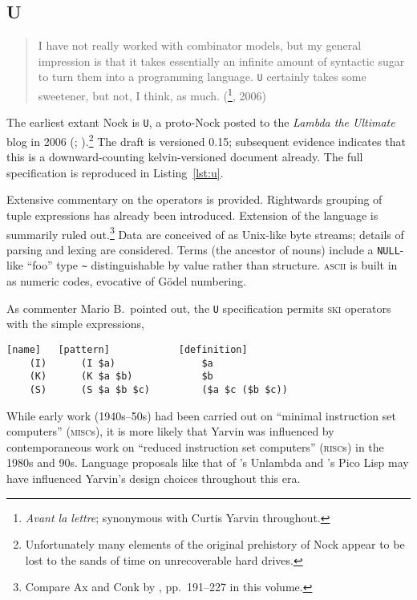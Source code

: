 \documentclass[twoside]{article}
\begin{document}
\subsection[\texttt{U}]{U}

\begin{quote}
I have not really worked with combinator models, but my general impression is that it takes essentially an infinite amount of syntactic sugar to turn them into a programming language. \texttt{U} certainly takes some sweetener, but not, I think, as much.  (\footnote{\emph{Avant la lettre}; synonymous with Curtis Yarvin throughout.}, 2006)
\end{quote}

\sloppy
The earliest extant Nock is \texttt{U}, a proto-Nock posted to the \textit{Lambda the Ultimate} blog in 2006 (\citet{Yarvin2006a}; \citet{Yarvin2006}).\footnote{Unfortunately many elements of the original prehistory of Nock appear to be lost to the sands of time on unrecoverable hard drives.}  The draft is versioned 0.15; subsequent evidence indicates that this is a downward-counting kelvin-versioned document already.  The full specification is reproduced in Listing~\ref{lst:u}.

Extensive commentary on the operators is provided.  Rightwards grouping of tuple expressions has already been introduced.  Extension of the language is summarily ruled out.\footnote{Compare Ax and Conk by , pp.~191–227 in this volume.}  Data are conceived of as Unix-like byte streams; details of parsing and lexing are considered.  Terms (the ancestor of nouns) include a \texttt{NULL}-like ``foo'' type \texttt{\textasciitilde} distinguishable by value rather than structure.  \textsc{ascii} is built in as numeric codes, evocative of G\"{o}del numbering.

As commenter Mario B.\ pointed out, the \texttt{U} specification permits \textsc{ski} operators with the simple expressions,

\begin{lstlisting}[style=listingblock]
   [name]   [pattern]            [definition]
    (I)      (I $a)               $a
    (K)      (K $a $b)            $b
    (S)      (S $a $b $c)         ($a $c ($b $c))
\end{lstlisting}

While early work (1940s--50s) had been carried out on ``minimal instruction set computers'' (\textsc{misc}s), it is more likely that Yarvin was influenced by contemporaneous work on ``reduced instruction set computers'' (\textsc{risc}s) in the 1980s and 90s.  Language proposals like that of \citeauthor{Madore2003}'s Unlambda and \citeauthor{Burger2006}'s Pico Lisp may have influenced Yarvin's design choices throughout this era.
\end{document}
